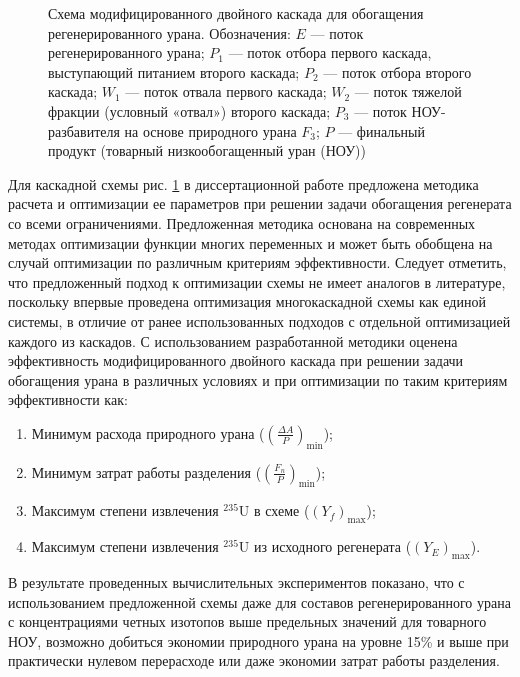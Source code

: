 \begin{figure}[ht]
  \caption{Схема модифицированного двойного каскада для обогащения регенерированного урана. Обозначения: $E$ --- поток регенерированного урана; $P_1$ --- поток отбора первого каскада, выступающий питанием второго каскада; $P_2$ --- поток отбора второго каскада; $W_1$ --- поток отвала первого каскада; $W_2$ --- поток тяжелой фракции (условный «отвал») второго каскада; $P_3$ --- поток НОУ-разбавителя на основе природного урана $F_3$; $P$ --- финальный продукт (товарный низкообогащенный уран (НОУ))}\label{p2left_autoref}
\end{figure}

Для каскадной схемы рис. \ref{p2left_autoref} в диссертационной работе предложена методика расчета и оптимизации ее параметров при решении задачи обогащения регенерата со всеми ограничениями. Предложенная методика основана на современных методах оптимизации функции многих переменных и может быть обобщена на случай оптимизации по различным критериям эффективности. Следует отметить, что предложенный подход к оптимизации схемы не имеет аналогов в литературе, поскольку впервые проведена оптимизация многокаскадной схемы как единой системы, в отличие от ранее использованных подходов с отдельной оптимизацией каждого из каскадов. С использованием разработанной методики оценена эффективность модифицированного двойного каскада при решении задачи обогащения урана в различных условиях и при оптимизации по таким критериям эффективности как:

\begin{enumerate}
  \item Минимум расхода природного урана ($(\frac{\Delta A}{P})_\text{min}$);
  \item Минимум затрат работы разделения ($(\frac{F_n}{P})_\text{min}$);
  \item Максимум степени извлечения $^{235}$U в схеме ($(Y_f)_\text{max}$);
  \item Максимум степени извлечения $^{235}$U из исходного регенерата ($(Y_{E})_\text{max}$).
\end{enumerate}  

В результате проведенных вычислительных экспериментов показано, что с использованием предложенной схемы даже для составов регенерированного урана с концентрациями четных изотопов выше предельных значений для товарного НОУ, возможно добиться экономии природного урана на уровне 15\% и выше при практически нулевом перерасходе или даже экономии затрат работы разделения. 

